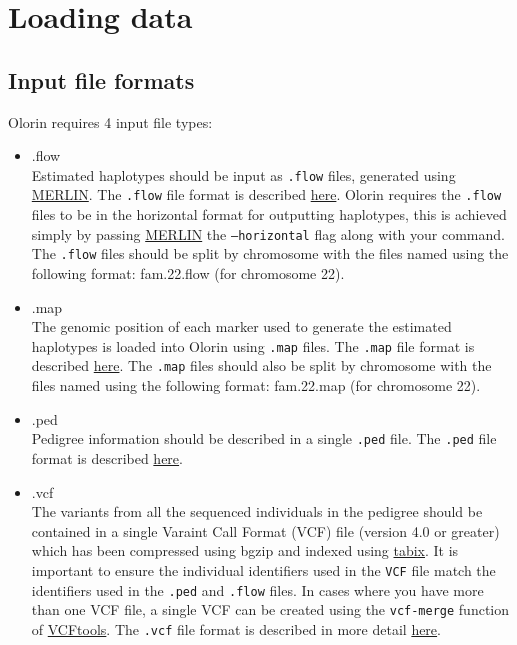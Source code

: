 \documentclass{article}
\begin{document}
\section{Loading data}
\subsection{Input file formats}
Olorin requires 4 input file types:
\begin{itemize}
	\item{.flow}\\
	Estimated haplotypes should be input as \texttt{.flow} files, generated using \href{http://www.sph.umich.edu/csg/abecasis/Merlin/}{MERLIN}. The \texttt{.flow} file format is described \href{http://www.sph.umich.edu/csg/abecasis/Merlin/tour/haplotyping.html}{here}. Olorin requires the \texttt{.flow} files to be in the horizontal format for outputting haplotypes, this is achieved simply by passing \href{http://www.sph.umich.edu/csg/abecasis/Merlin/reference.html}{MERLIN} the \texttt{--horizontal} flag along with your command. The \texttt{.flow} files should be split by chromosome with the files named using the following format: fam.22.flow (for chromosome 22).
	\item{.map}\\
	The genomic position of each marker used to generate the estimated haplotypes is loaded into Olorin using \texttt{.map} files. The \texttt{.map} file format is described \href{http://pngu.mgh.harvard.edu/~purcell/plink/data.shtml#map}{here}. The \texttt{.map} files should also be split by chromosome with the files named using the following format: fam.22.map (for chromosome 22).
	\item{.ped}\\
	Pedigree information should be described in a single \texttt{.ped} file. The \texttt{.ped} file format is described \href{http://pngu.mgh.harvard.edu/~purcell/plink/data.shtml#ped}{here}.
	\item{.vcf}\\
	The variants from all the sequenced individuals in the pedigree should be contained in a single Varaint Call Format (VCF) file (version 4.0 or greater) which has been compressed using bgzip and indexed using \href{http://samtools.sourceforge.net/tabix.shtml}{tabix}. It is important to ensure the individual identifiers used in the \texttt{VCF} file match the identifiers used in the \texttt{.ped} and \texttt{.flow} files. In cases where you have more than one VCF file, a single VCF can be created using the \texttt{vcf-merge} function of \href{http://vcftools.sourceforge.net/}{VCFtools}. The \texttt{.vcf} file format is described in more detail \href{http://www.1000genomes.org/node/101}{here}.
\end{itemize}
\end{document}
